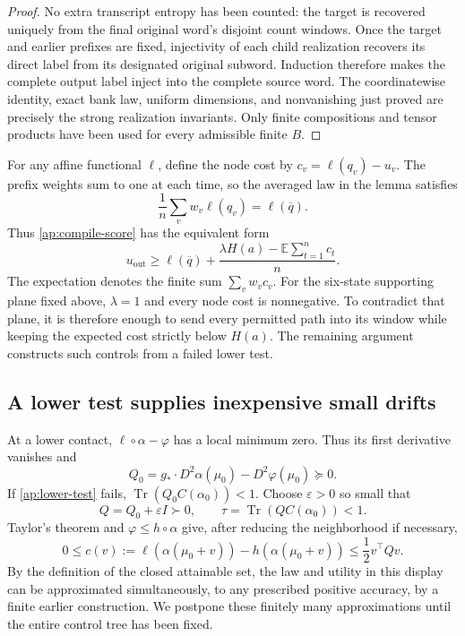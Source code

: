 \documentclass[11pt]{article}
\numberwithin{equation}{section}
\theoremstyle{definition}
\theoremstyle{remark}
\begin{document}
\begin{proof}
No extra transcript entropy has been counted: the target is recovered
uniquely from the final original word's disjoint count windows.  Once
the target and earlier prefixes are fixed, injectivity of each child
realization recovers its direct label from its designated original subword.
Induction therefore makes the complete output label inject into the
complete source word.  The coordinatewise identity, exact bank law,
uniform dimensions, and nonvanishing just proved are precisely the strong
realization invariants.  Only finite compositions and tensor products have
been used for every admissible finite \(B\).
\end{proof}

For any affine functional \(\ell\), define the node cost by
\(c_v=\ell(q_v)-u_v\).  The prefix weights sum to one at each time,
so the averaged law in the lemma satisfies
\[
 \frac1n\sum_v w_v\ell(q_v)=\ell(\overline q).
\]
Thus \eqref{ap:compile-score} has the equivalent form
\begin{equation}\label{ap:compile-gain}
 u_{\mathrm{out}}
 \geq\ell(\overline q)
       +\frac{\lambda H(a)-\mathbb E\sum_{t=1}^n c_t}{n}.
\end{equation}
The expectation denotes the finite sum \(\sum_v w_vc_v\).
For the six-state supporting plane fixed above, \(\lambda=1\) and
every node cost is nonnegative.  To contradict that plane, it is therefore
enough to send every permitted path into its window while keeping the
expected cost strictly below \(H(a)\).  The remaining argument constructs
such controls from a failed lower test.

\subsection{A lower test supplies inexpensive small drifts}
\label{ap:local-cost}

At a lower contact, \(\ell\circ\alpha-\varphi\) has a local minimum
zero.  Thus its first derivative vanishes and
\begin{equation}\label{ap:q0}
 Q_0=g_*\cdot D^2\alpha(\mu_0)-D^2\varphi(\mu_0)\succeq0.
\end{equation}
If \eqref{ap:lower-test} fails, \(\operatorname{Tr}(Q_0C(\alpha_0))<1\).
Choose \(\varepsilon>0\) so small that
\begin{equation}\label{ap:tau}
 Q=Q_0+\varepsilon I\succ0,
 \qquad \tau=\operatorname{Tr}(QC(\alpha_0))<1.
\end{equation}
Taylor's theorem and \(\varphi\leq h\circ\alpha\) give, after reducing
the neighborhood if necessary,
\begin{equation}\label{ap:local-cost-bound}
 0\leq c(v):=\ell(\alpha(\mu_0+v))-h(\alpha(\mu_0+v))
 \leq \frac12v^\top Qv.
\end{equation}
By the definition of the closed attainable set, the law and utility in
this display can be approximated simultaneously, to any prescribed positive
accuracy, by a finite earlier construction.  We postpone these finitely
many approximations until the entire control tree has been fixed.
\end{document}
